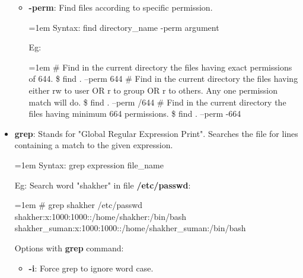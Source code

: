 \begin{flushleft}
\begin{itemize}
\begin{itemize}
			\item \textbf{-perm}: Find files according to specific permission.
			\bigskip
			\begin{tcolorbox}[breakable,notitle,boxrule=-0pt,colback=pink,colframe=pink]
				\color{black}
				\font=1em
				Syntax: find directory\_name -perm argument
				\font=4pt
			\end{tcolorbox}
			Eg:
			\bigskip
			\begin{tcolorbox}[breakable,notitle,boxrule=-0pt,colback=black,colframe=black]
				\color{white}
				\font=1em
				\color{yellow}
				\# Find in the current directory the files having exact permissions of 644.
				\color{green}
				\newline
				\$ find . –perm 644
				\newline
				\color{yellow}
				\newline
				\# Find in the current directory the files having \color{yellow} either rw to user OR r to group OR r to \color{yellow} others. Any one permission match will do.
				\color{green}
				\newline
				\$ find . –perm /644 
				\newline
				\color{yellow}
				\newline
				\# Find in the current directory the files having minimum 664 permissions.
				\color{green}
				\newline
				\$ find . –perm -664
				\font=4pt
			\end{tcolorbox}		
		\end{itemize}
		
		\bigskip
		\bigskip
		\item \textbf{grep}: Stands for "Global Regular Expression Print". Searches the file for lines containing a match to the given expression.
		\newline
			\begin{tcolorbox}[breakable,notitle,boxrule=-0pt,colback=pink,colframe=pink]
				\color{black}
				\font=1em
				Syntax: grep expression file\_name
				\font=4pt
			\end{tcolorbox}
		Eg: Search word "shakher" in file \textbf{/etc/passwd}:
			\bigskip
			\begin{tcolorbox}[breakable,notitle,boxrule=-0pt,colback=black,colframe=black]
				\color{green}
				\font=1em
				\# grep shakher /etc/passwd
				\newline
				\color{white}
				shakher:x:1000:1000::/home/shakher:/bin/bash
				\newline
				shakher\_suman:x:1000:1000::/home/shakher\_suman:/bin/bash
				\font=4pt
			\end{tcolorbox}
		Options with \textbf{grep} command:
		\begin{itemize}
			\item \textbf{-i}: Force grep to ignore word case.
			\bigskip
			

\end{itemize}
\end{itemize}
\end{flushleft}
